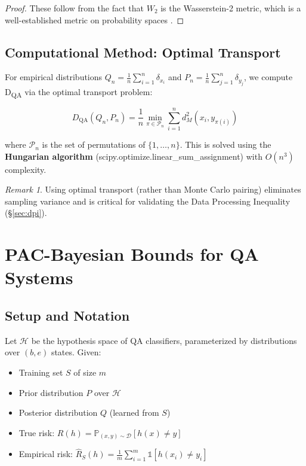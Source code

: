 \documentclass[11pt]{article}
\theoremstyle{remark}
\newtheorem{remark}[theorem]{Remark}
\begin{document}
\begin{proof}
These follow from the fact that $W_2$ is the Wasserstein-2 metric, which is a well-established metric on probability spaces \cite{villani2009optimal}.
\end{proof}

\subsection{Computational Method: Optimal Transport}

For empirical distributions $Q_n = \frac{1}{n}\sum_{i=1}^n \delta_{x_i}$ and $P_n = \frac{1}{n}\sum_{j=1}^n \delta_{y_j}$, we compute D\textsubscript{QA} via the optimal transport problem:

\begin{equation}
D_{\text{QA}}(Q_n, P_n) = \frac{1}{n} \min_{\pi \in \mathcal{P}_n} \sum_{i=1}^n d_M^2(x_i, y_{\pi(i)})
\end{equation}

where $\mathcal{P}_n$ is the set of permutations of $\{1, \ldots, n\}$. This is solved using the \textbf{Hungarian algorithm} (scipy.optimize.linear\_sum\_assignment) with $O(n^3)$ complexity.

\begin{remark}
Using optimal transport (rather than Monte Carlo pairing) eliminates sampling variance and is critical for validating the Data Processing Inequality (\S\ref{sec:dpi}).
\end{remark}

\section{PAC-Bayesian Bounds for QA Systems}
\label{sec:pac_bounds}

\subsection{Setup and Notation}

Let $\mathcal{H}$ be the hypothesis space of QA classifiers, parameterized by distributions over $(b, e)$ states. Given:
\begin{itemize}
    \item Training set $S$ of size $m$
    \item Prior distribution $P$ over $\mathcal{H}$
    \item Posterior distribution $Q$ (learned from $S$)
    \item True risk: $R(h) = \mathbb{P}_{(x,y) \sim \mathcal{D}}[h(x) \neq y]$
    \item Empirical risk: $\hat{R}_S(h) = \frac{1}{m}\sum_{i=1}^m \mathbb{1}[h(x_i) \neq y_i]$
\end{itemize}
\end{document}
